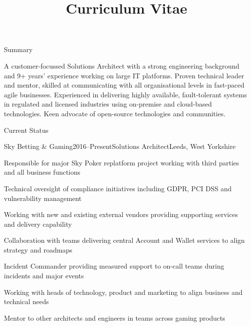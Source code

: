 \documentclass{cv}
\title{Curriculum Vitae}
\begin{document}

\begin{rSection}{Summary}

A customer-focussed Solutions Architect with a strong engineering background and 9+ years'
experience working on large IT platforms. Proven technical leader and mentor, skilled at
communicating with all organisational levels in fast-paced agile businesses. Experienced in
delivering highly available, fault-tolerant systems in regulated and licensed industries using
on-premise and cloud-based technologies. Keen advocate of open-source technologies and communities.

\end{rSection}


\begin{rSection}{Current Status}

\begin{rSubsection}{Sky Betting \& Gaming}{2016--Present}{Solutions Architect}{Leeds, West Yorkshire}
\item Responsible for major Sky Poker replatform project working with third parties and all business functions
\item Technical oversight of compliance initiatives including GDPR, PCI DSS and vulnerability management
\item Working with new and existing external vendors providing supporting services and delivery capability
\item Collaboration with teams delivering central Account and Wallet services to align strategy and roadmaps
\item Incident Commander providing measured support to on-call teams during incidents and major events
\item Working with heads of technology, product and marketing to align business and technical needs
\item Mentor to other architects and engineers in teams across gaming products
\end{rSubsection}

\end{rSection}
\end{document}
